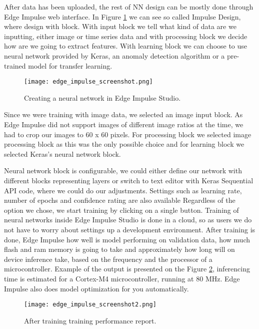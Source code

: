 
After data has been uploaded, the rest of NN design can be mostly done through Edge Impulse web interface.
In Figure \ref{edge_impulse_screenshot} we can see so called Impulse Design, where design with block.
With input block we tell what kind of data are we inputting, either image or time series data and with processing block we decide how are we going to extract features.
With learning block we can choose to use neural network provided by Keras, an anomaly detection algorithm or a pre-trained model for transfer learning.

\begin{figure}[ht]
    \centering
    \texttt{[image: edge\_impulse\_screenshot.png]} 
    \caption{Creating a neural network in Edge Impulse Studio.}
    \label{edge_impulse_screenshot}
\end{figure}

Since we were training with image data, we selected an image input block. As Edge Impulse did not support images of different image ratios at the time, we had to crop our images to 60 x 60 pixels.
For processing block we selected image processing block as this was the only possible choice and for learning block we selected Keras's neural network block.

Neural network block is configurable, we could either define our network with different blocks representing layers or switch to text editor with Keras Sequential API code, where we could do our adjustments.
Settings such as learning rate, number of epochs and confidence rating are also available 
Regardless of the option we chose, we start training by clicking on a single button.
Training of neural networks inside Edge Impulse Studio is done in a cloud, so as users we do not have to worry about settings up a development environment.
After training is done, Edge Impulse how well is model performing on validation data, how much flash and ram memory is going to take and approximately how long will on device inference take, based on the frequency and the processor of a microcontroller.
Example of the output is presented on the Figure \ref{edge_impulse_screenshot2}, inferencing time is estimated for a Cortex-M4 microcontroller, running at 80 \si{\mega\hertz}.
Edge Impulse also does model optimization for you automatically.

\begin{figure}[ht]
    \centering
    \texttt{[image: edge\_impulse\_screenshot2.png]} 
    \caption{After training training performance report.}
    \label{edge_impulse_screenshot2}
\end{figure}

